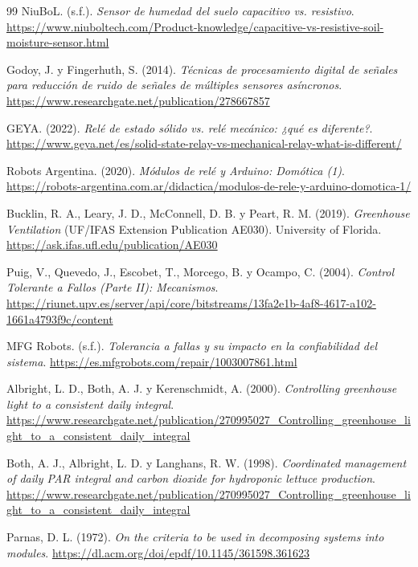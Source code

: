 \begin{thebibliography}{99}
NiuBoL. (s.f.). \textit{Sensor de humedad del suelo capacitivo vs. resistivo}. \url{https://www.niuboltech.com/Product-knowledge/capacitive-vs-resistive-soil-moisture-sensor.html}

Godoy, J. y Fingerhuth, S. (2014). \textit{Técnicas de procesamiento digital de señales para reducción de ruido de señales de múltiples sensores asíncronos}. \url{https://www.researchgate.net/publication/278667857}

GEYA. (2022). \textit{Relé de estado sólido vs. relé mecánico: ¿qué es diferente?}. \url{https://www.geya.net/es/solid-state-relay-vs-mechanical-relay-what-is-different/}

Robots Argentina. (2020). \textit{Módulos de relé y Arduino: Domótica (1)}. \url{https://robots-argentina.com.ar/didactica/modulos-de-rele-y-arduino-domotica-1/}

Bucklin, R. A., Leary, J. D., McConnell, D. B. y Peart, R. M. (2019). \textit{Greenhouse Ventilation} (UF/IFAS Extension Publication AE030). University of Florida. \url{https://ask.ifas.ufl.edu/publication/AE030}

Puig, V., Quevedo, J., Escobet, T., Morcego, B. y Ocampo, C. (2004). \textit{Control Tolerante a Fallos (Parte II): Mecanismos}. \url{https://riunet.upv.es/server/api/core/bitstreams/13fa2e1b-4af8-4617-a102-1661a4793f9c/content}

MFG Robots. (s.f.). \textit{Tolerancia a fallas y su impacto en la confiabilidad del sistema}. \url{https://es.mfgrobots.com/repair/1003007861.html}

Albright, L. D., Both, A. J. y Kerenschmidt, A. (2000). \textit{Controlling greenhouse light to a consistent daily integral}. \url{https://www.researchgate.net/publication/270995027_Controlling_greenhouse_light_to_a_consistent_daily_integral}

Both, A. J., Albright, L. D. y Langhans, R. W. (1998). \textit{Coordinated management of daily PAR integral and carbon dioxide for hydroponic lettuce production}. \url{https://www.researchgate.net/publication/270995027_Controlling_greenhouse_light_to_a_consistent_daily_integral}

Parnas, D. L. (1972). \textit{On the criteria to be used in decomposing systems into modules}. \url{https://dl.acm.org/doi/epdf/10.1145/361598.361623}


\end{thebibliography}
